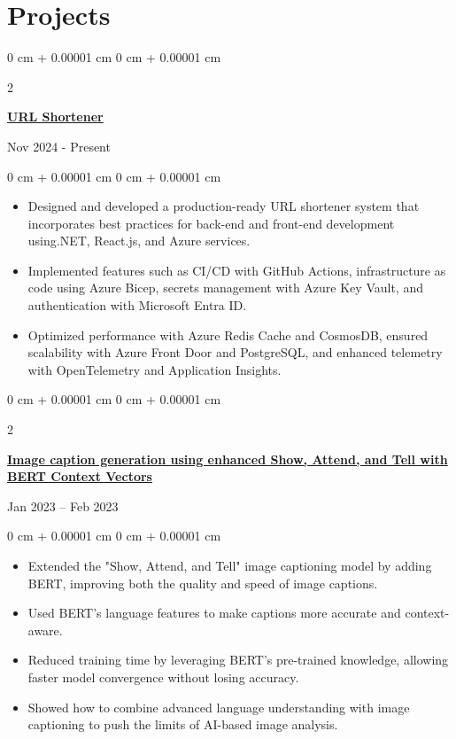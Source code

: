 \documentclass[10pt, letterpaper]{article}
\newenvironment{highlights}{
    \begin{itemize}[
        topsep=0.10 cm,
        parsep=0.10 cm,
        partopsep=0pt,
        itemsep=0pt,
        leftmargin=0 cm + 10pt
    ]
}{
    \end{itemize}
} %
\newenvironment{onecolentry}{
    \begin{adjustwidth}{
        0 cm + 0.00001 cm
    }{
        0 cm + 0.00001 cm
    }
}{
    \end{adjustwidth}
} %
\newenvironment{twocolentry}[2][]{
    \onecolentry
    \def\secondColumn{#2}
    \setcolumnwidth{\fill, 4.5 cm}
    \begin{paracol}{2}
}{
    \switchcolumn \raggedleft \secondColumn
    \end{paracol}
    \endonecolentry
} %
\begin{document}
\section{Projects}
               \begin{twocolentry}{
            {Nov 2024 - Present}
        }
            \href{https://github.com/thromel/URLShortener}{\textbf{URL Shortener}}
        \end{twocolentry}
        \begin{onecolentry}
            \begin{highlights}
                
                    \item Designed and developed a production-ready URL shortener system that incorporates best practices for back-end and front-end development using.NET, React.js, and Azure services.
	            \item Implemented features such as CI/CD with GitHub Actions, infrastructure as code using Azure Bicep, secrets management with Azure Key Vault, and authentication with Microsoft Entra ID.
	           \item Optimized performance with Azure Redis Cache and CosmosDB, ensured scalability with Azure Front Door and PostgreSQL, and enhanced telemetry with OpenTelemetry and Application Insights.
                \end{highlights}
                
        \end{onecolentry}

        \begin{twocolentry}{
    {Jan 2023 – Feb 2023}
}
    \href{https://github.com/thromel/Image-Captioning-ML-Project}{\textbf{Image caption generation using enhanced Show, Attend, and Tell with BERT Context Vectors}}
\end{twocolentry}

\begin{onecolentry}
    \begin{highlights}
        \item Extended the "Show, Attend, and Tell" image captioning model by adding BERT, improving both the quality and speed of image captions.
        \item Used BERT's language features to make captions more accurate and context-aware.
        \item Reduced training time by leveraging BERT's pre-trained knowledge, allowing faster model convergence without losing accuracy.
        \item Showed how to combine advanced language understanding with image captioning to push the limits of AI-based image analysis.
    \end{highlights}
\end{onecolentry}
        
\end{document}
